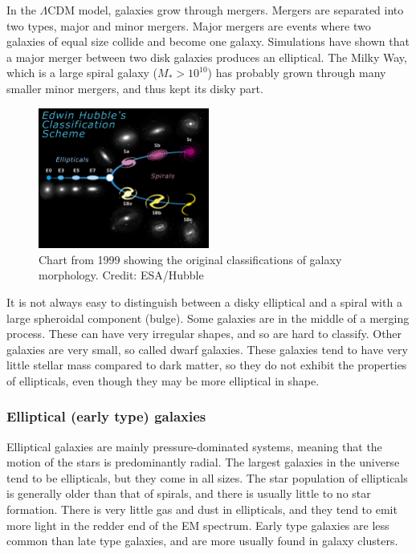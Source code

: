 In the $\Lambda$CDM model, galaxies grow through mergers. Mergers are separated into two types, major and minor mergers.  Major mergers are events where two galaxies of equal size collide and become one galaxy. Simulations have shown that a major merger between two disk galaxies produces an elliptical. The Milky Way, which is a large spiral galaxy ($M_*>10^{10}$) has probably grown through many smaller minor mergers, and thus kept its disky part.

\begin{figure}
    \centering
    \includegraphics[width=0.5\textwidth]{images/hubble.jpg}
    \caption{Chart from 1999 showing the original classifications of galaxy morphology. Credit: ESA/Hubble}
    \label{hubble}
\end{figure}

It is not always easy to distinguish between a disky elliptical and a spiral with a large spheroidal component (bulge). Some galaxies are in the middle of a merging process. These can have very irregular shapes, and so are hard to classify. Other galaxies are very small, so called dwarf galaxies. These galaxies tend to have very little stellar mass compared to dark matter, so they do not exhibit the properties of ellipticals, even though they may be more elliptical in shape.

\subsubsection{Elliptical (early type) galaxies}
Elliptical galaxies are mainly pressure-dominated systems, meaning that the motion of the stars is predominantly radial. The largest galaxies in the universe tend to be ellipticals, but they come in all sizes. The star population of ellipticals is generally older than that of spirals, and there is usually little to no star formation. There is very little gas and dust in ellipticals, and they tend to emit more light in the redder end of the EM spectrum. Early type galaxies are less common than late type galaxies, and are more usually found in galaxy clusters.

